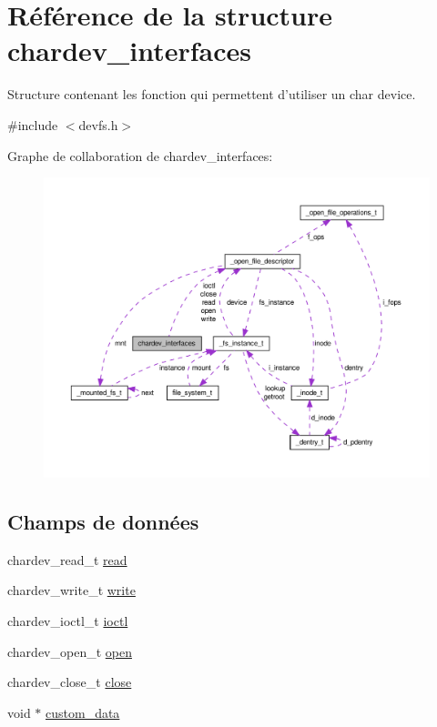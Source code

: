 \hypertarget{structchardev__interfaces}{\section{Référence de la structure chardev\-\_\-interfaces}
\label{structchardev__interfaces}
}


Structure contenant les fonction qui permettent d'utiliser un char device.  




{\ttfamily \#include $<$devfs.\-h$>$}



Graphe de collaboration de chardev\-\_\-interfaces\-:\nopagebreak
\begin{figure}[H]
\begin{center}
\leavevmode
\includegraphics[width=350pt]{structchardev__interfaces__coll__graph}
\end{center}
\end{figure}
\subsection*{Champs de données}
\begin{DoxyCompactItemize}
\item 
chardev\-\_\-read\-\_\-t \hyperlink{structchardev__interfaces_afeba560360e6a5dfff549d78c220b68b}{read}
\item 
chardev\-\_\-write\-\_\-t \hyperlink{structchardev__interfaces_a6f70961f2f888de24d500d50bae85a3f}{write}
\item 
chardev\-\_\-ioctl\-\_\-t \hyperlink{structchardev__interfaces_a9e5903e31e8e5ab21e9abc4b3a844e4a}{ioctl}
\item 
chardev\-\_\-open\-\_\-t \hyperlink{structchardev__interfaces_a7962a67531ea5263a2f837c36fb18dc0}{open}
\item 
chardev\-\_\-close\-\_\-t \hyperlink{structchardev__interfaces_a9cba421c4dddc041e4b5029d011dbbd9}{close}
\item 
void $\ast$ \hyperlink{structchardev__interfaces_a9b6b938d76fe7e20c93da8a032a42ad7}{custom\-\_\-data}
\end{DoxyCompactItemize}


